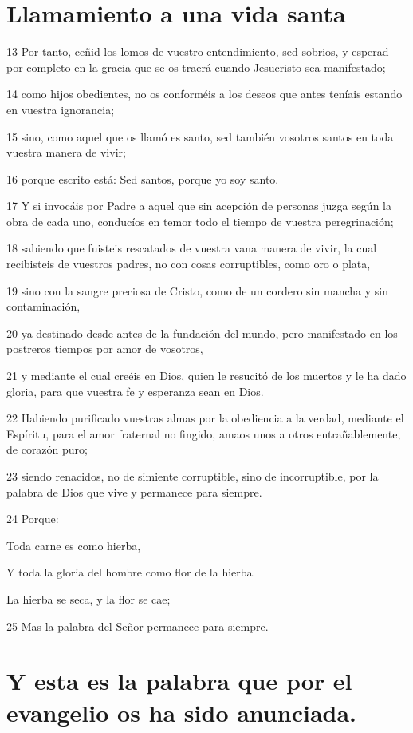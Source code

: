 \section*{Llamamiento a una vida santa}

\par 13 Por tanto, ceñid los lomos de vuestro entendimiento, sed sobrios, y esperad por completo en la gracia que se os traerá cuando Jesucristo sea manifestado;
\par 14 como hijos obedientes, no os conforméis a los deseos que antes teníais estando en vuestra ignorancia;
\par 15 sino, como aquel que os llamó es santo, sed también vosotros santos en toda vuestra manera de vivir;
\par 16 porque escrito está: Sed santos, porque yo soy santo.
\par 17 Y si invocáis por Padre a aquel que sin acepción de personas juzga según la obra de cada uno, conducíos en temor todo el tiempo de vuestra peregrinación;
\par 18 sabiendo que fuisteis rescatados de vuestra vana manera de vivir, la cual recibisteis de vuestros padres, no con cosas corruptibles, como oro o plata,
\par 19 sino con la sangre preciosa de Cristo, como de un cordero sin mancha y sin contaminación,
\par 20 ya destinado desde antes de la fundación del mundo, pero manifestado en los postreros tiempos por amor de vosotros,
\par 21 y mediante el cual creéis en Dios, quien le resucitó de los muertos y le ha dado gloria, para que vuestra fe y esperanza sean en Dios.
\par 22 Habiendo purificado vuestras almas por la obediencia a la verdad, mediante el Espíritu, para el amor fraternal no fingido, amaos unos a otros entrañablemente, de corazón puro;
\par 23 siendo renacidos, no de simiente corruptible, sino de incorruptible, por la palabra de Dios que vive y permanece para siempre.
\par 24 Porque:
\par Toda carne es como hierba,
\par Y toda la gloria del hombre como flor de la hierba.
\par La hierba se seca, y la flor se cae;
\par 25 Mas la palabra del Señor permanece para siempre.
\section*{Y esta es la palabra que por el evangelio os ha sido anunciada.}

